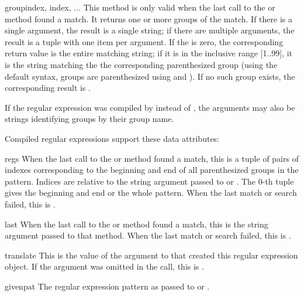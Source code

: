 \begin{funcdesc}{group}{index, index, ...}
This method is only valid when the last call to the 
or  method found a match.  It returns one or more
groups of the match.  If there is a single  argument,
the result is a single string; if there are multiple arguments, the
result is a tuple with one item per argument.  If the  is
zero, the corresponding return value is the entire matching string; if
it is in the inclusive range [1..99], it is the string matching the
the corresponding parenthesized group (using the default syntax,
groups are parenthesized using \code{{\e}(} and \code{{\e})}).  If no
such group exists, the corresponding result is .

If the regular expression was compiled by  instead of
, the  arguments may also be strings
identifying groups by their group name.
\end{funcdesc}

\noindent
Compiled regular expressions support these data attributes:


\begin{datadesc}{regs}
When the last call to the  or  method found a
match, this is a tuple of pairs of indexes corresponding to the
beginning and end of all parenthesized groups in the pattern.  Indices
are relative to the string argument passed to  or
.  The 0-th tuple gives the beginning and end or the
whole pattern.  When the last match or search failed, this is
.
\end{datadesc}

\begin{datadesc}{last}
When the last call to the  or  method found a
match, this is the string argument passed to that method.  When the
last match or search failed, this is .
\end{datadesc}

\begin{datadesc}{translate}
This is the value of the  argument to
 that created this regular expression object.  If
the  argument was omitted in the 
call, this is .
\end{datadesc}

\begin{datadesc}{givenpat}
The regular expression pattern as passed to  or
.
\end{datadesc}


